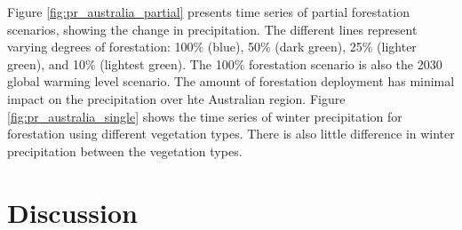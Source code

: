 \documentclass[]{article}
\begin{document}

Figure \ref{fig:pr_australia_partial} presents time series of partial forestation scenarios, showing the change in precipitation. The different lines represent varying degrees of forestation: 100\% (blue), 50\% (dark green), 25\% (lighter green), and 10\% (lightest green).
The 100\% forestation scenario is also the 2030 global warming level scenario.
The amount of forestation deployment has minimal impact on the precipitation over hte Australian region.
Figure \ref{fig:pr_australia_single} shows the time series of winter precipitation for forestation using different vegetation types.
There is also little difference in winter precipitation between the vegetation types.

\section{Discussion}

%
%
%
\end{document}
